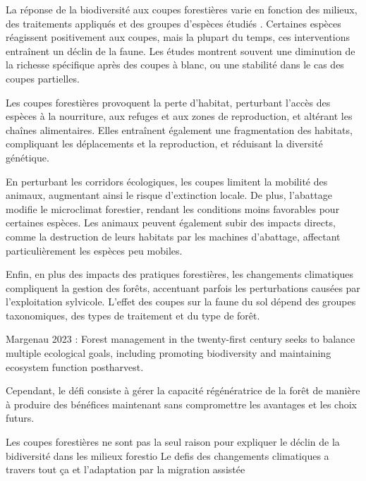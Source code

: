 
La réponse de la biodiversité aux coupes forestières varie en fonction des milieux, des traitements appliqués et des groupes d'espèces étudiés \citep{Kudrin2023metaanalysiseffects}.
Certaines espèces réagissent positivement aux coupes, mais la plupart du temps, ces interventions entraînent un déclin de la faune. 
Les études montrent souvent une diminution de la richesse spécifique après des coupes à blanc, ou une stabilité dans le cas des coupes partielles.

Les coupes forestières provoquent la perte d'habitat, perturbant l'accès des espèces à la nourriture, aux refuges et aux zones de reproduction, et altérant les chaînes alimentaires. 
Elles entraînent également une fragmentation des habitats, compliquant les déplacements et la reproduction, et réduisant la diversité génétique.

En perturbant les corridors écologiques, les coupes limitent la mobilité des animaux, augmentant ainsi le risque d'extinction locale. 
De plus, l'abattage modifie le microclimat forestier, rendant les conditions moins favorables pour certaines espèces. 
Les animaux peuvent également subir des impacts directs, comme la destruction de leurs habitats par les machines d'abattage, affectant particulièrement les espèces peu mobiles.

Enfin, en plus des impacts des pratiques forestières, les changements climatiques compliquent la gestion des forêts, accentuant parfois les perturbations causées par l'exploitation sylvicole. 
L'effet des coupes sur la faune du sol dépend des groupes taxonomiques, des types de traitement et du type de forêt.



Margenau 2023 : Forest management in the twenty-first century seeks to balance multiple ecological goals, including promoting biodiversity and maintaining ecosystem function postharvest.

Cependant, le défi consiste à gérer la capacité régénératrice de la forêt de manière à produire des bénéfices maintenant sans compromettre les avantages et les choix futurs.

Les coupes forestières ne sont pas la seul raison pour expliquer le déclin de la bidiversité dans les milieux forestio
Le defis des changements climatiques a travers tout ça et l'adaptation par la migration assistée


